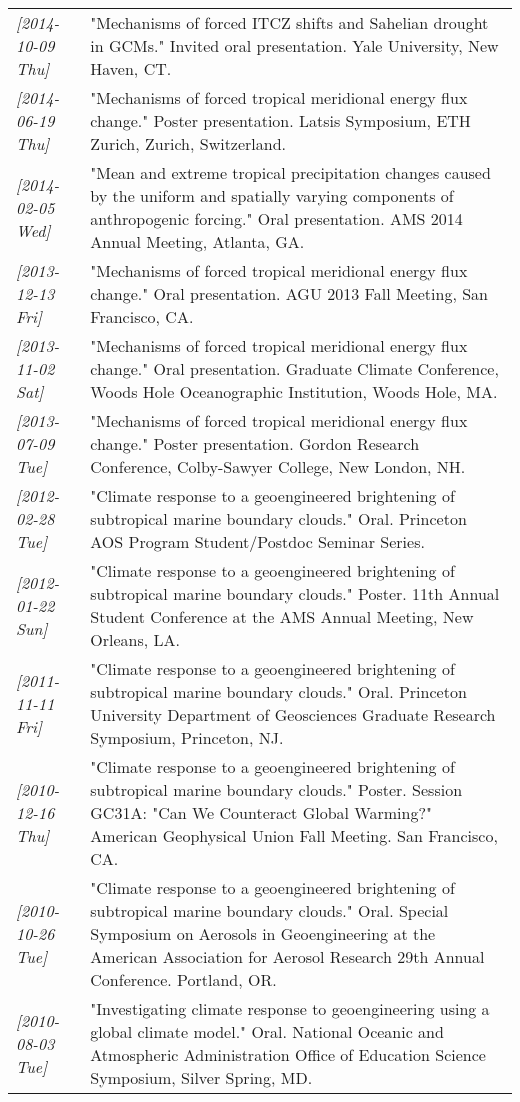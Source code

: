\documentclass{article}
\begin{document}
\begin{center}
\begin{tabularx}{\textwidth}{lX}
\textit{[2014-10-09 Thu]} & "Mechanisms of forced ITCZ shifts and Sahelian drought in GCMs."  Invited oral presentation.  Yale University, New Haven, CT.\\
\textit{[2014-06-19 Thu]} & "Mechanisms of forced tropical meridional energy flux change."  Poster presentation.  Latsis Symposium, ETH Zurich, Zurich, Switzerland.\\
\textit{[2014-02-05 Wed]} & "Mean and extreme tropical precipitation changes caused by the uniform and spatially varying components of anthropogenic forcing."  Oral presentation.  AMS 2014 Annual Meeting, Atlanta, GA.\\
\textit{[2013-12-13 Fri]} & "Mechanisms of forced tropical meridional energy flux change."  Oral presentation.  AGU 2013 Fall Meeting, San Francisco, CA.\\
\textit{[2013-11-02 Sat]} & "Mechanisms of forced tropical meridional energy flux change."  Oral presentation.  Graduate Climate Conference, Woods Hole Oceanographic Institution, Woods Hole, MA.\\
\textit{[2013-07-09 Tue]} & "Mechanisms of forced tropical meridional energy flux change."  Poster presentation.  Gordon Research Conference, Colby-Sawyer College, New London, NH.\\
\textit{[2012-02-28 Tue]} & "Climate response to a geoengineered brightening of subtropical marine boundary clouds."  Oral.  Princeton AOS Program Student/Postdoc Seminar Series.\\
\textit{[2012-01-22 Sun]} & "Climate response to a geoengineered brightening of subtropical marine boundary clouds."  Poster.  11th Annual Student Conference at the AMS Annual Meeting, New Orleans, LA.\\
\textit{[2011-11-11 Fri]} & "Climate response to a geoengineered brightening of subtropical marine boundary clouds."  Oral.  Princeton University Department of Geosciences Graduate Research Symposium, Princeton, NJ.\\
\textit{[2010-12-16 Thu]} & "Climate response to a geoengineered brightening of subtropical marine boundary clouds."  Poster.  Session GC31A: "Can We Counteract Global Warming?" American Geophysical Union Fall Meeting.  San Francisco, CA.\\
\textit{[2010-10-26 Tue]} & "Climate response to a geoengineered brightening of subtropical marine boundary clouds."  Oral.  Special Symposium on Aerosols in Geoengineering at the American Association for Aerosol Research 29th Annual Conference.  Portland, OR.\\
\textit{[2010-08-03 Tue]} & "Investigating climate response to geoengineering using a global climate model."  Oral.  National Oceanic and Atmospheric Administration Office of Education Science Symposium, Silver Spring, MD.\\
\end{tabularx}
\end{center}

\end{document}
